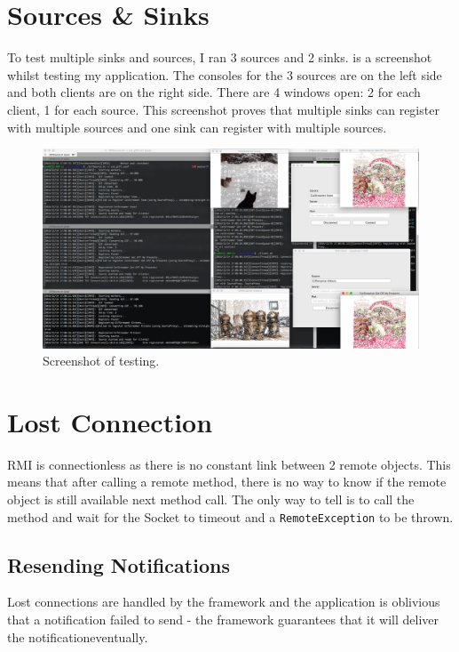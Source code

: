 \documentclass[a4paper]{article}
\begin{document}
\section{Sources \& Sinks}
To test multiple sinks and sources, I ran 3 sources and 2 sinks.
 is a screenshot whilst testing my application.
The consoles for the 3 sources are on the left side and both clients are on the right side.
There are 4 windows open: 2 for each client, 1 for each source.
This screenshot proves that multiple sinks can register with multiple sources and one sink can register with multiple sources.

\begin{figure}[h]
\includegraphics[width=\textwidth]{testing}
\caption{Screenshot of testing.\label{fig:testing}}
\end{figure}

\section{Lost Connection}\label{sec:lost_conns}
RMI is connectionless as there is no constant link between 2 remote objects.
This means that after calling a remote method, there is no way to know if the remote object is still available next method call.
The only way to tell is to call the method and wait for the Socket to timeout and a \texttt{RemoteException} to be thrown.

\subsection{Resending Notifications}
Lost connections are handled by the framework and the application is oblivious that a notification failed to send - the framework guarantees that it will deliver the notification\textellipsis eventually.
\end{document}
